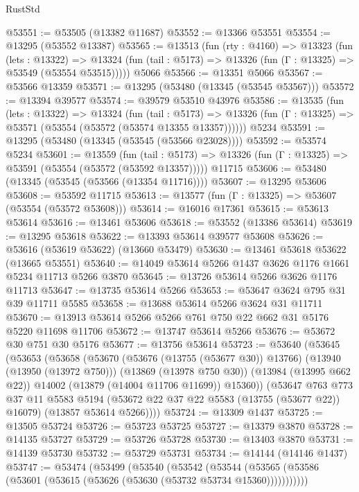 \begin{lexlean}{RustStd}
\begin{coremodule}
@53551 := @53505 (@13382 @11687)
@53552 := @13366 @53551
@53554 := @13295 (@53552 @13387)
@53565 := @13513
    (fun (rty : @4160) =>
    @13323
      (fun (lets : @13322) =>
      @13324 (fun (tail : @5173) => @13326 (fun (Γ : @13325) => @53549 (@53554 @53515)))))
    @5066
@53566 := @13351 @5066
@53567 := @53566 @13359
@53571 := @13295 (@53480 (@13345 (@53545 @53567)))
@53572 := @13394 @39577
@53574 := @39579 @53510 @43976
@53586 := @13535
    (fun (lets : @13322) =>
    @13324
      (fun (tail : @5173) =>
      @13326 (fun (Γ : @13325) => @53571 (@53554 (@53572 (@53574 @13355 @13357))))))
    @5234
@53591 := @13295 (@53480 (@13345 (@53545 (@53566 @23028))))
@53592 := @53574 @5234
@53601 := @13559
    (fun (tail : @5173) => @13326 (fun (Γ : @13325) => @53591 (@53554 (@53572 (@53592 @13357)))))
    @11715
@53606 := @53480 (@13345 (@53545 (@53566 (@13354 @11716))))
@53607 := @13295 @53606
@53608 := @53592 @11715
@53613 := @13577 (fun (Γ : @13325) => @53607 (@53554 (@53572 @53608)))
@53614 := @16016 @17361
@53615 := @53613 @53614
@53616 := @13461 @53606
@53618 := @53552 (@13386 @53614)
@53619 := @13295 @53618
@53622 := @13393 @53614 @39577 @53608
@53626 := @53616 (@53619 @53622) (@13660 @53479)
@53630 := @13461 @53618 @53622 (@13665 @53551)
@53640 := @14049 @53614 @5266 @1437 @3626 @1176 @1661 @5234 @11713 @5266 @3870
@53645 := @13726 @53614 @5266 @3626 @1176 @11713
@53647 := @13735 @53614 @5266
@53653 := @53647 @3624 @795 @31 @39 @11711 @5585
@53658 := @13688 @53614 @5266 @3624 @31 @11711
@53670 := @13913 @53614 @5266 @5266 @761 @750 @22 @662 @31 @5176 @5220 @11698 @11706
@53672 := @13747 @53614 @5266
@53676 := @53672 @30 @751 @30 @5176
@53677 := @13756 @53614
@53723 := @53640
    (@53645
      (@53653
        (@53658
          (@53670
            (@53676 (@13755 (@53677 @30)) @13766)
            (@13940 (@13950 (@13972 @750)))
            (@13869 (@13978 @750 @30))
            (@13984 (@13995 @662 @22))
            @14002
            (@13879 (@14004 @11706 @11699))
            @15360))
        (@53647
          @763
          @773
          @37
          @11
          @5583
          @5194
          (@53672 @22 @37 @22 @5583 (@13755 (@53677 @22)) @16079)
          (@13857 @53614 @5266))))
@53724 := @13309 @1437
@53725 := @13505 @53724
@53726 := @53723 @53725
@53727 := @13379 @3870
@53728 := @14135 @53727
@53729 := @53726 @53728
@53730 := @13403 @3870
@53731 := @14139 @53730
@53732 := @53729 @53731
@53734 := @14144 (@14146 @1437)
@53747 := @53474
    (@53499
      (@53540
        (@53542
          (@53544 (@53565 (@53586 (@53601 (@53615 (@53626 (@53630 (@53732 @53734 @15360)))))))))))

\end{coremodule}
\end{lexlean}
